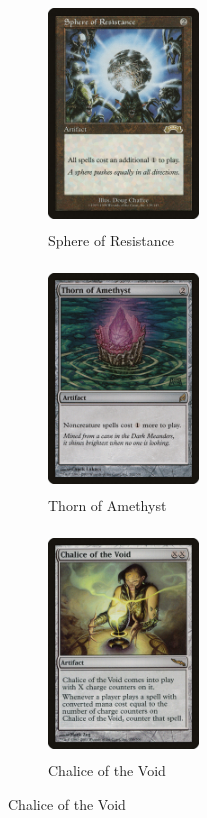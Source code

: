 \documentclass{report}
\begin{document}
\begin{figure}
  \begin{subfigure}[b]{.325\textwidth}
\begin{center}
    \includegraphics [width = 4cm, height = 6cm] {sphere-of-resistance}
    \caption{Sphere of Resistance}
    \label{fig:1}
\end{center}
  \end{subfigure}
  \begin{subfigure}[b]{.325\textwidth}
\begin{center}
    \includegraphics [width = 4cm, height = 6cm] {thorn-of-amethyst}
    \caption{Thorn of Amethyst}
    \label{fig:2}
\end{center}
  \end{subfigure}
%
  \begin{subfigure}[b]{.325\textwidth}
\begin{center}
    \includegraphics [width = 4cm, height = 6cm] {chalice-of-the-void}
    \caption{Chalice of the Void}
    \label{fig:3}
\end{center}
  \end{subfigure}
\end{figure}
\end{document}
